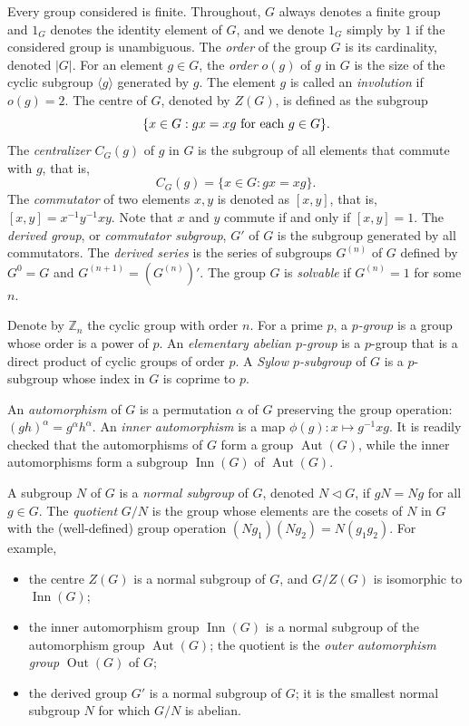 \documentclass{elsarticle}
\newcommand{\Aut}{\mathop{\mathrm{Aut}}}
\newcommand{\Inn}{\mathop{\mathrm{Inn}}}
\newcommand{\Out}{\mathop{\mathrm{Out}}}
\begin{document}
Every group considered is finite. Throughout, $G$ always denotes a
finite group and $1_G$ denotes the identity element of $G$, and we
denote $1_G$ simply by $1$ if the considered group is unambiguous.
The {\em order} of the group $G$ is its cardinality, denoted
$|G|$. For an element $g\in G$, the {\em order} $o(g)$ of $g$ in $G$
is the size of the cyclic subgroup $\langle g\rangle$ generated by
$g$. The element $g$ is called an {\em involution} if $o(g)=2$. The
centre of $G$, denoted by $Z(G)$, is defined as the subgroup
\[
\{x\in G: gx=xg \hbox{ for each $g\in G$}\}.
\]
The {\em centralizer} $C_G(g)$ of $g$ in $G$ is the subgroup of
all elements that commute with $g$, that is,
\[
C_G(g)=\{x\in G: gx=xg\}.
\]
The {\em commutator} of two elements $x,y$ is denoted as $[x,y]$, that
is, $[x,y]=x^{-1}y^{-1}xy$. Note that $x$ and $y$ commute if and only
if $[x,y]=1$. The \emph{derived group}, or \emph{commutator subgroup}, $G'$
of $G$ is the subgroup generated by all commutators. The \emph{derived series}
is the series of subgroups $G^{(n)}$ of $G$ defined by $G^{0}=G$ and
$G^{(n+1)}=(G^{(n)})'$. The group $G$ is \emph{solvable} if $G^{(n)}=1$ for
some $n$.

Denote by $\mathbb{Z}_n$ the cyclic group with order
$n$.  For a prime $p$, a \emph{$p$-group} is a group whose order is a
power of $p$.  An {\em elementary abelian $p$-group} is a $p$-group
that is a direct product of cyclic groups of order $p$. A {\em Sylow
  $p$-subgroup} of $G$ is a $p$-subgroup whose index in $G$ is coprime
to $p$.

An \emph{automorphism} of $G$ is a permutation $\alpha$ of $G$ preserving
the group operation: $(gh)^\alpha=g^\alpha h^\alpha$. An \emph{inner
automorphism} is a map $\phi(g):x\mapsto g^{-1}xg$. It is readily checked
that the automorphisms of $G$ form a group $\Aut(G)$, while the
inner automorphisms form a subgroup $\Inn(G)$ of $\Aut(G)$.

A subgroup $N$ of $G$ is a \emph{normal subgroup} of $G$, denoted
$N\lhd G$, if $gN=Ng$ for all $g\in G$. The \emph{quotient} $G/N$ is
the group whose elements are the cosets of $N$ in $G$ with the (well-defined)
group operation $(Ng_1)(Ng_2)=N(g_1g_2)$. For example,
\begin{itemize}
\item the centre $Z(G)$ is a normal subgroup of $G$, and $G/Z(G)$ is isomorphic
to $\Inn(G)$;
\item the inner automorphism group $\Inn(G)$ is a normal subgroup of the
automorphism group $\Aut(G)$; the quotient is the \emph{outer automorphism
group} $\Out(G)$ of $G$;
\item the derived group $G'$ is a normal subgroup of $G$; it is the smallest
normal subgroup $N$ for which $G/N$ is abelian.
\end{itemize}
\end{document}
